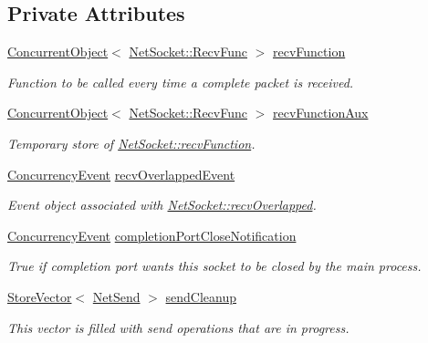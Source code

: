\subsection*{Private Attributes}
\begin{DoxyCompactItemize}
\item 
\hypertarget{class_net_socket_a92fcd22d674b159c192f356728d2a575}{
\hyperlink{class_concurrent_object}{ConcurrentObject}$<$ \hyperlink{class_net_socket_a52b5f4de8d0a47fd8620f542b21c076c}{NetSocket::RecvFunc} $>$ \hyperlink{class_net_socket_a92fcd22d674b159c192f356728d2a575}{recvFunction}}
\label{class_net_socket_a92fcd22d674b159c192f356728d2a575}

\begin{DoxyCompactList}\small\item\em Function to be called every time a complete packet is received. \item\end{DoxyCompactList}\item 
\hyperlink{class_concurrent_object}{ConcurrentObject}$<$ \hyperlink{class_net_socket_a52b5f4de8d0a47fd8620f542b21c076c}{NetSocket::RecvFunc} $>$ \hyperlink{class_net_socket_a7d4dd5d72c86d0ee4f46a3ec9e03bdfc}{recvFunctionAux}
\begin{DoxyCompactList}\small\item\em Temporary store of \hyperlink{class_net_socket_a92fcd22d674b159c192f356728d2a575}{NetSocket::recvFunction}. \item\end{DoxyCompactList}\item 
\hyperlink{class_concurrency_event}{ConcurrencyEvent} \hyperlink{class_net_socket_aeeae305cd0382ee87cf9c35aec571719}{recvOverlappedEvent}
\begin{DoxyCompactList}\small\item\em Event object associated with \hyperlink{class_net_socket_ac260f690a6f192c22463d1f5ea903d96}{NetSocket::recvOverlapped}. \item\end{DoxyCompactList}\item 
\hyperlink{class_concurrency_event}{ConcurrencyEvent} \hyperlink{class_net_socket_aeff1c796b40fa0545b6b3f2bb7767f4d}{completionPortCloseNotification}
\begin{DoxyCompactList}\small\item\em True if completion port wants this socket to be closed by the main process. \item\end{DoxyCompactList}\item 
\hyperlink{class_store_vector}{StoreVector}$<$ \hyperlink{class_net_send}{NetSend} $>$ \hyperlink{class_net_socket_a84e789c6d2552eef894f1f751539233f}{sendCleanup}
\begin{DoxyCompactList}\small\item\em This vector is filled with send operations that are in progress. \item\end{DoxyCompactList}\end{DoxyCompactItemize}


